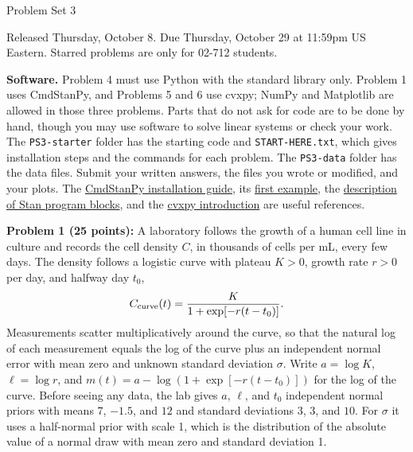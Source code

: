 \documentclass[11pt]{article}
\begin{document}
{\setlength{\textwidth}{\dimexpr\linewidth-2\fboxsep-2\fboxrule\relax}
\par}

\begin{center}
{\huge Problem Set 3 }\\
\end{center}

Released Thursday, October 8. Due Thursday, October 29 at 11:59pm US Eastern.
Starred problems are only for 02-712 students.

{\bf Software.} Problem 4 must use Python with the standard library only. Problem 1 uses
CmdStanPy, and Problems 5 and 6 use cvxpy; NumPy and Matplotlib are allowed in those three
problems. Parts that do not ask for code are to be done by hand, though you may use software to
solve linear systems or check your work.
The {\tt PS3-starter} folder has the starting code and {\tt START-HERE.txt}, which
gives installation steps and the commands for each problem. The {\tt PS3-data} folder has the
data files. Submit your written answers, the files you wrote or modified, and your plots. The
\href{https://mc-stan.org/cmdstanpy/installation.html}{CmdStanPy installation guide},
its \href{https://mc-stan.org/cmdstanpy/users-guide/hello_world.html}{first example},
the \href{https://mc-stan.org/docs/reference-manual/blocks.html}{description of Stan program blocks},
and the \href{https://www.cvxpy.org/tutorial/intro/index.html}{cvxpy introduction} are useful
references.

\vspace{0.5em}
{\bf Problem 1 (25 points):} A laboratory follows the growth of a human cell line in culture
and records the cell density $C$, in thousands of cells per mL, every few days. The density
follows a logistic curve with plateau $K>0$, growth rate $r>0$ per day, and halfway day $t_0$,
\[
C_{\rm curve}(t)=\frac{K}{1+\exp[-r(t-t_0)]}.
\]
Measurements scatter multiplicatively around the curve, so that the natural log of each measurement
equals the log of the curve plus an independent normal error with mean zero and unknown
standard deviation $\sigma$. Write $a=\log K$, $\ell=\log r$, and
$m(t)=a-\log(1+\exp[-r(t-t_0)])$ for the log of the curve. Before seeing any data, the lab
gives $a$, $\ell$, and $t_0$ independent normal priors with means $7$, $-1.5$, and $12$ and
standard deviations $3$, $3$, and $10$. For $\sigma$ it uses a half-normal prior with
scale 1, which is the distribution of the absolute value of a normal draw with mean zero and
standard deviation 1.
\end{document}
